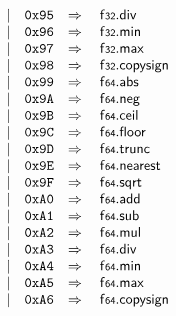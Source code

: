 $$\begin{array}[t]{@{}lrrl@{}l@{}l@{}l@{}}
& & | & \mathtt{0x95} & \quad\Rightarrow\quad{} & \mathsf{f{\scriptstyle 32}} {.} \mathsf{div} \\
& & | & \mathtt{0x96} & \quad\Rightarrow\quad{} & \mathsf{f{\scriptstyle 32}} {.} \mathsf{min} \\
& & | & \mathtt{0x97} & \quad\Rightarrow\quad{} & \mathsf{f{\scriptstyle 32}} {.} \mathsf{max} \\
& & | & \mathtt{0x98} & \quad\Rightarrow\quad{} & \mathsf{f{\scriptstyle 32}} {.} \mathsf{copysign} \\
& & | & \mathtt{0x99} & \quad\Rightarrow\quad{} & \mathsf{f{\scriptstyle 64}} {.} \mathsf{abs} \\
& & | & \mathtt{0x9A} & \quad\Rightarrow\quad{} & \mathsf{f{\scriptstyle 64}} {.} \mathsf{neg} \\
& & | & \mathtt{0x9B} & \quad\Rightarrow\quad{} & \mathsf{f{\scriptstyle 64}} {.} \mathsf{ceil} \\
& & | & \mathtt{0x9C} & \quad\Rightarrow\quad{} & \mathsf{f{\scriptstyle 64}} {.} \mathsf{floor} \\
& & | & \mathtt{0x9D} & \quad\Rightarrow\quad{} & \mathsf{f{\scriptstyle 64}} {.} \mathsf{trunc} \\
& & | & \mathtt{0x9E} & \quad\Rightarrow\quad{} & \mathsf{f{\scriptstyle 64}} {.} \mathsf{nearest} \\
& & | & \mathtt{0x9F} & \quad\Rightarrow\quad{} & \mathsf{f{\scriptstyle 64}} {.} \mathsf{sqrt} \\
& & | & \mathtt{0xA0} & \quad\Rightarrow\quad{} & \mathsf{f{\scriptstyle 64}} {.} \mathsf{add} \\
& & | & \mathtt{0xA1} & \quad\Rightarrow\quad{} & \mathsf{f{\scriptstyle 64}} {.} \mathsf{sub} \\
& & | & \mathtt{0xA2} & \quad\Rightarrow\quad{} & \mathsf{f{\scriptstyle 64}} {.} \mathsf{mul} \\
& & | & \mathtt{0xA3} & \quad\Rightarrow\quad{} & \mathsf{f{\scriptstyle 64}} {.} \mathsf{div} \\
& & | & \mathtt{0xA4} & \quad\Rightarrow\quad{} & \mathsf{f{\scriptstyle 64}} {.} \mathsf{min} \\
& & | & \mathtt{0xA5} & \quad\Rightarrow\quad{} & \mathsf{f{\scriptstyle 64}} {.} \mathsf{max} \\
& & | & \mathtt{0xA6} & \quad\Rightarrow\quad{} & \mathsf{f{\scriptstyle 64}} {.} \mathsf{copysign} \\
\end{array}
$$

